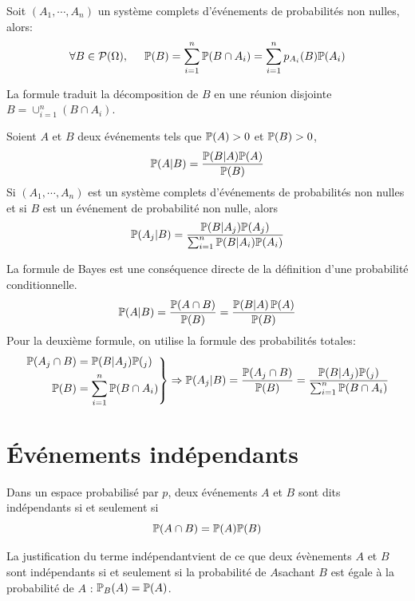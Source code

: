 \begin{prop}
Soit $(A_1,\cdots,A_n)$ un système complets d'événements de probabilités non nulles, alors: 
\begin{displaymath}
\forall B\in \mathcal{P}(\Omega),\hspace{0.5cm} \mathbb{P}(B) = \sum_{i=1}^{n}\mathbb{P}(B\cap A_i) = \sum_{i=1}^{n}p_{A_i}(B)\mathbb{P}(A_i)
\end{displaymath}
\end{prop}
\begin{demo}
  La formule traduit la décomposition de $B$ en une réunion disjointe $B = \cup_{i=1}^{n}(B\cap A_i)$.
\end{demo}

\begin{prop}
 Soient $A$ et $B$ deux événements tels que $\mathbb{P}(A)>0$ et $\mathbb{P}(B)>0$,
\begin{displaymath}
 \mathbb{P}(A|B) = \frac{\mathbb{P}(B|A)\mathbb{P}(A)}{\mathbb{P}(B)}
\end{displaymath}
Si $(A_1,\cdots,A_n)$ est un système complets d'événements de probabilités non nulles et si $B$ est un événement de probabilité non nulle, alors
\begin{displaymath}
 \mathbb{P}(A_j|B) = \frac{\mathbb{P}(B|A_j) \mathbb{P}(A_j)}{\sum_{i=1}^n\mathbb{P}(B|A_i)\mathbb{P}(A_i)}
\end{displaymath}
\end{prop}
\begin{demo}
  La formule de Bayes est une conséquence directe de la définition d'une probabilité conditionnelle.
\begin{displaymath}
  \mathbb{P}(A|B) = \frac{\mathbb{P}(A\cap B)}{\mathbb{P}(B)} = \frac{\mathbb{P}(B|A)\, \mathbb{P}(A)}{\mathbb{P}(B)}
\end{displaymath}
Pour la deuxième formule, on utilise la formule des probabilités totales:
\begin{displaymath}
\left. 
\begin{aligned}
\mathbb{P}(A_j \cap B) &= \mathbb{P}(B| A_j)\mathbb{P}(_j) \\
\mathbb{P}(B) &= \sum_{i=1}^{n}\mathbb{P}(B\cap A_i)
\end{aligned}
\right\rbrace \Rightarrow
\mathbb{P}(A_j|B) = \frac{\mathbb{P}(A_j \cap B)}{\mathbb{P}(B)} = \frac{\mathbb{P}(B| A_j)\mathbb{P}(_j)}{\sum_{i=1}^{n}\mathbb{P}(B\cap A_i)}
\end{displaymath}
\end{demo}


\section{\'Evénements indépendants}
\begin{defi}
Dans un espace probabilisé par $p$, deux événements $A$ et $B$ sont dits indépendants si et seulement si 
\begin{displaymath}
  \mathbb{P}(A\cap B) = \mathbb{P}(A)\mathbb{P}(B)
\end{displaymath}  
\end{defi}
\begin{rem}
 La justification du terme \og indépendant\fg vient de ce que deux évènements $A$ et $B$ sont indépendants si et seulement si la probabilité de $A$sachant $B$ est égale à la probabilité de $A$ : $\mathbb{P}_B(A) = \mathbb{P}(A)$.
\end{rem}

